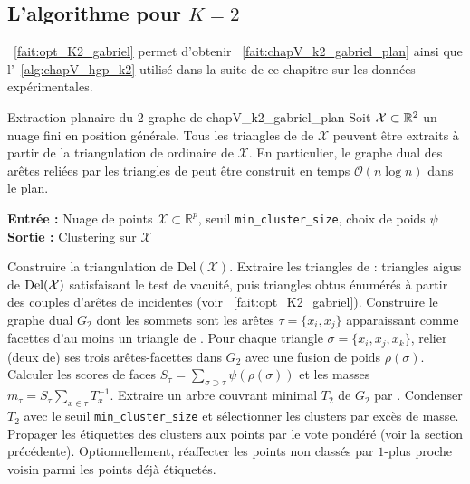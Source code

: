 \subsection{L'algorithme pour $K=2$}

\Fact~\ref{fait:opt_K2_gabriel} permet d'obtenir \Fact~\ref{fait:chapV_k2_gabriel_plan} ainsi que l'\Alg~\ref{alg:chapV_hgp_k2} utilisé dans la suite de ce chapitre sur les données expérimentales. 

\begin{Fait}{Extraction planaire du \(2\)-graphe de  \cite{BibiAppliedNetworkScience}}{chapV_k2_gabriel_plan}
Soit $\mathcal{X}\subset\mathbb R^2$ un nuage fini en position générale. Tous les triangles de  de $\mathcal X$ peuvent être extraits à partir de la triangulation de  ordinaire de $\mathcal X$. En particulier, le graphe dual des arêtes reliées par les triangles de  peut être construit en temps $\mathcal O(n\log n)$ dans le plan.
\end{Fait}



\begin{algorithm}[htbp]
  \caption{{\HGP-Clusterer} pour $K=2$ avec sortie en partition stricte}\label{alg:chapV_hgp_k2}
  \textbf{Entrée :} Nuage de points $\mathcal X\subset\mathbb R^p$, seuil \texttt{min\_cluster\_size}, choix de poids $\psi$\\
  \textbf{Sortie :} Clustering sur $\mathcal X$
  \begin{algorithmic}[1]
    \State Construire la triangulation de  $\mathrm{Del}(\mathcal X)$.
    \State Extraire les triangles de  : triangles aigus de $\mathrm{Del}(\mathcal{X})$ satisfaisant le test de vacuité, puis triangles obtus énumérés à partir des couples d'arêtes de  incidentes (voir \Fact~\ref{fait:opt_K2_gabriel}).
    \State Construire le graphe dual $G_2$ dont les sommets sont les arêtes $\tau=\{x_i,x_j\}$ apparaissant comme facettes d'au moins un triangle de .
    \State Pour chaque triangle $\sigma=\{x_i,x_j,x_k\}$, relier (deux de) ses trois arêtes-facettes dans $G_2$ avec une fusion de poids $\rho(\sigma)$.
    \State Calculer les scores de faces $S_\tau=\sum_{\sigma\supset\tau}\psi(\rho(\sigma))$ et les masses $m_\tau=S_\tau\sum_{x\in\tau}T_x^{-1}$.
    \State Extraire un arbre couvrant minimal $T_2$ de $G_2$ par .
    \State Condenser $T_2$ avec le seuil \texttt{min\_cluster\_size} \cite{HDBSCAN2017} et sélectionner les clusters par excès de masse.
    \State Propager les étiquettes des clusters aux points par le vote pondéré (voir la section précédente).
    \State Optionnellement, réaffecter les points non classés par $1$-plus proche voisin parmi les points déjà étiquetés.
  \end{algorithmic}
\end{algorithm}


